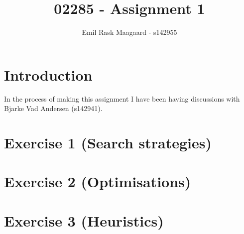 \documentclass{dtu_report_short}
\title{02285 - Assignment 1}
\author{Emil Rask Maagaard - s142955}
\begin{document}
\maketitle{}


\section*{Introduction}

In the process of making this assignment I have been having discussions with Bjarke Vad Andersen (s142941). 


\section*{Exercise 1 (Search strategies)}


\section*{Exercise 2 (Optimisations)}


\newpage
\section*{Exercise 3 (Heuristics)}



% 
\end{document}
